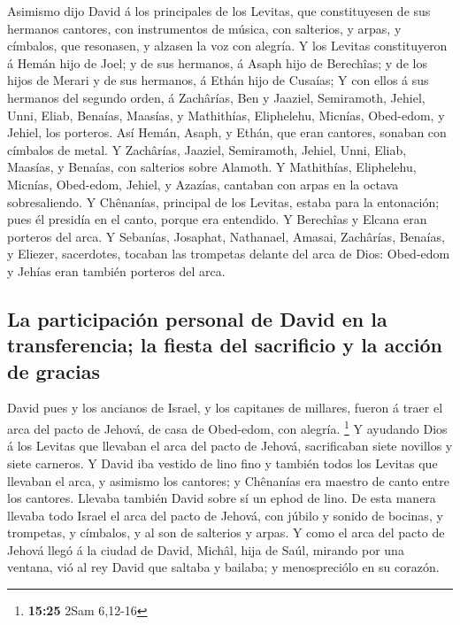  Asimismo dijo David á los principales de los Levitas, que
constituyesen de sus hermanos cantores, con instrumentos de música, con
salterios, y arpas, y címbalos, que resonasen, y alzasen la voz con
alegría.  Y los Levitas constituyeron á Hemán hijo de Joel;
y de sus hermanos, á Asaph hijo de Berechîas; y de los hijos de Merari y
de sus hermanos, á Ethán hijo de Cusaías;  Y con ellos á
sus hermanos del segundo orden, á Zachârías, Ben y Jaaziel, Semiramoth,
Jehiel, Unni, Eliab, Benaías, Maasías, y Mathithías, Eliphelehu,
Micnías, Obed-edom, y Jehiel, los porteros.  Así Hemán,
Asaph, y Ethán, que eran cantores, sonaban con címbalos de metal.
 Y Zachârías, Jaaziel, Semiramoth, Jehiel, Unni, Eliab,
Maasías, y Benaías, con salterios sobre Alamoth.  Y
Mathithías, Eliphelehu, Micnías, Obed-edom, Jehiel, y Azazías, cantaban
con arpas en la octava sobresaliendo.  Y Chênanías,
principal de los Levitas, estaba para la entonación; pues él presidía en
el canto, porque era entendido.  Y Berechîas y Elcana eran
porteros del arca.  Y Sebanías, Josaphat, Nathanael,
Amasai, Zachârías, Benaías, y Eliezer, sacerdotes, tocaban las trompetas
delante del arca de Dios: Obed-edom y Jehías eran también porteros del
arca.

\hypertarget{la-participaciuxf3n-personal-de-david-en-la-transferencia-la-fiesta-del-sacrificio-y-la-acciuxf3n-de-gracias}{%
\subsection{La participación personal de David en la transferencia; la
fiesta del sacrificio y la acción de
gracias}\label{la-participaciuxf3n-personal-de-david-en-la-transferencia-la-fiesta-del-sacrificio-y-la-acciuxf3n-de-gracias}}

 David pues y los ancianos de Israel, y los capitanes de
millares, fueron á traer el arca del pacto de Jehová, de casa de
Obed-edom, con alegría. \footnote{\textbf{15:25} 2Sam 6,12-16}
 Y ayudando Dios á los Levitas que llevaban el arca del
pacto de Jehová, sacrificaban siete novillos y siete carneros.
 Y David iba vestido de lino fino y también todos los
Levitas que llevaban el arca, y asimismo los cantores; y Chênanías era
maestro de canto entre los cantores. Llevaba también David sobre sí un
ephod de lino.  De esta manera llevaba todo Israel el arca
del pacto de Jehová, con júbilo y sonido de bocinas, y trompetas, y
címbalos, y al son de salterios y arpas.  Y como el arca
del pacto de Jehová llegó á la ciudad de David, Michâl, hija de Saúl,
mirando por una ventana, vió al rey David que saltaba y bailaba; y
menospreciólo en su corazón.

